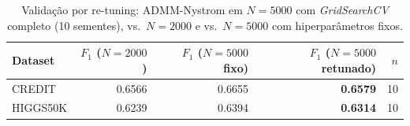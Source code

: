 \begin{table}[ht]
  \centering
  \caption[Validação por \textit{re-tuning} do ADMM-Nyström em $N{=}5000$]{Validação por re-tuning: ADMM-Nystrom em $N{=}5000$ com \textit{GridSearchCV} completo (10 sementes), vs.\ $N{=}2000$ e vs.\ $N{=}5000$ com hiperparâmetros fixos.}
  \label{tab:tier2_n5000_admm_retune}
  \begin{tabular}{lrrrr}
    \toprule
    Dataset & $F_1$ ($N{=}2000$) & $F_1$ ($N{=}5000$ fixo) & $F_1$ ($N{=}5000$ retunado) & $n$ \\
    \midrule
    CREDIT & 0.6566 & 0.6655 & \textbf{0.6579} & 10 \\
    HIGGS50K & 0.6239 & 0.6394 & \textbf{0.6314} & 10 \\
    \bottomrule
  \end{tabular}
\end{table}
